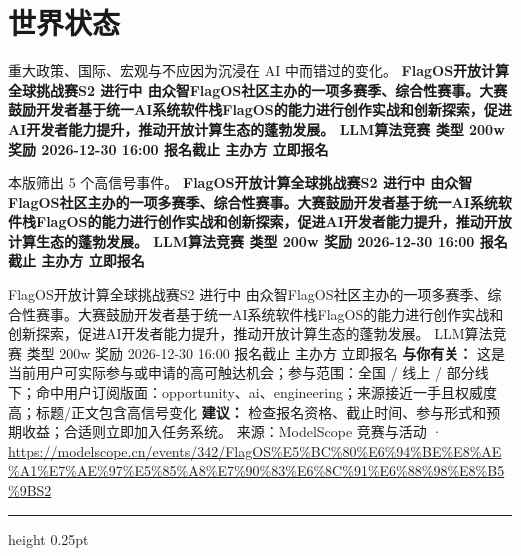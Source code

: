 \documentclass[10.5pt]{ctexart}
\begin{document}
\section*{世界状态}
{\color{ormuted} 重大政策、国际、宏观与不应因为沉浸在 AI 中而错过的变化。}
\vspace{2mm}
{\LARGE\bfseries FlagOS开放计算全球挑战赛S2 进行中 由众智FlagOS社区主办的一项多赛季、综合性赛事。大赛鼓励开发者基于统一AI系统软件栈FlagOS的能力进行创作实战和创新探索，促进AI开发者能力提升，推动开放计算生态的蓬勃发展。 LLM算法竞赛 类型 200w 奖励 2026-12-30 16:00 报名截止 主办方 立即报名}\par
\vspace{1mm}
{\color{ormuted} 本版筛出 5 个高信号事件。}
\vspace{3mm}
{\Large\bfseries FlagOS开放计算全球挑战赛S2 进行中 由众智FlagOS社区主办的一项多赛季、综合性赛事。大赛鼓励开发者基于统一AI系统软件栈FlagOS的能力进行创作实战和创新探索，促进AI开发者能力提升，推动开放计算生态的蓬勃发展。 LLM算法竞赛 类型 200w 奖励 2026-12-30 16:00 报名截止 主办方 立即报名}\par
FlagOS开放计算全球挑战赛S2 进行中 由众智FlagOS社区主办的一项多赛季、综合性赛事。大赛鼓励开发者基于统一AI系统软件栈FlagOS的能力进行创作实战和创新探索，促进AI开发者能力提升，推动开放计算生态的蓬勃发展。 LLM算法竞赛 类型 200w 奖励 2026-12-30 16:00 报名截止 主办方 立即报名
\textbf{与你有关：} 这是当前用户可实际参与或申请的高可触达机会；参与范围：全国 / 线上 / 部分线下；命中用户订阅版面：opportunity、ai、engineering；来源接近一手且权威度高；标题/正文包含高信号变化
\textbf{建议：} 检查报名资格、截止时间、参与形式和预期收益；合适则立即加入任务系统。
{\footnotesize\color{ormuted} 来源：ModelScope 竞赛与活动 · \url{https://modelscope.cn/events/342/FlagOS%E5%BC%80%E6%94%BE%E8%AE%A1%E7%AE%97%E5%85%A8%E7%90%83%E6%8C%91%E6%88%98%E8%B5%9BS2}}
\vspace{4mm}
\hrule height 0.25pt
\vspace{3mm}
\end{document}
